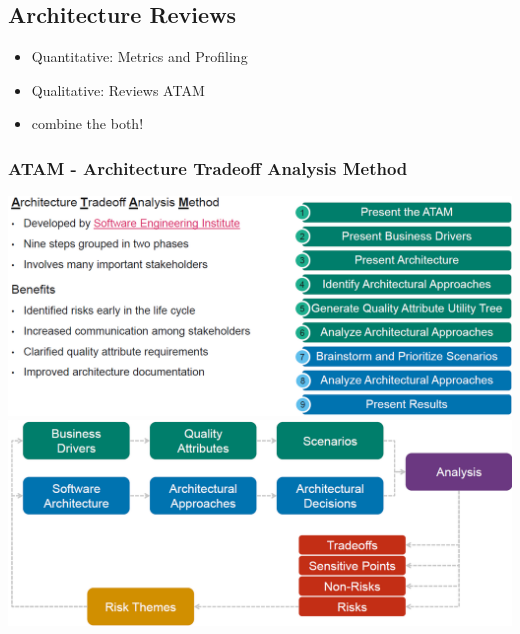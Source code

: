 \subsection{Architecture Reviews}
\begin{itemize}
    \item Quantitative: Metrics and Profiling
    \item Qualitative: Reviews ATAM
    \item combine the both!
\end{itemize}

\subsubsection{ATAM - Architecture Tradeoff Analysis Method}
\includegraphics[width=\linewidth]{../img/ATAM.png}
\includegraphics[width=\linewidth]{../img/ATAM_flow.png}

